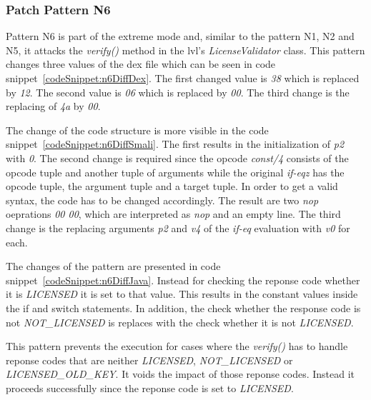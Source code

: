 \subsubsection{Patch Pattern N6}
Pattern N6 is part of the extreme mode and, similar to the pattern N1, N2 and N5, it attacks the \textit{verify()} method in the \gls{lvl}'s \textit{LicenseValidator} class.
\newline
This pattern changes three values of the \gls{dex} file which can be seen in code snippet~\ref{codeSnippet:n6DiffDex}.
The first changed value is \textit{38} which is replaced by \textit{12}.
The second value is \textit{06} which is replaced by \textit{00}.
The third change is the replacing of \textit{4a} by \textit{00}.
\newline

The change of the code structure is more visible in the code snippet~\ref{codeSnippet:n6DiffSmali}.
The first results in the initialization of \textit{p2} with \textit{0}.
The second change is required since the opcode \textit{const/4} consists of the  opcode tuple and another tuple of arguments while the original \textit{if-eqz} has the opcode tuple, the argument tuple and a target tuple.
In order to get a valid syntax, the code has to be changed accordingly.
The result are two \textit{nop} oeprations \textit{00 00}, which are interpreted as \textit{nop} and an empty line.
The third change is the replacing arguments \textit{p2} and \textit{v4} of the \textit{if-eq} evaluation with \textit{v0} for each.
\newline

The changes of the pattern are presented in code snippet~\ref{codeSnippet:n6DiffJava}.
Instead for checking the reponse code whether it is \textit{LICENSED} it is set to that value.
This results in the constant values inside the if and switch statements.
In addition, the check whether the response code is not \textit{NOT\_LICENSED} is replaces with the check whether it is not \textit{LICENSED}.
\newline

This pattern prevents the execution for cases where the \textit{verify()} has to handle reponse codes that are neither \textit{LICENSED}, \textit{NOT\_LICENSED} or \textit{LICENSED\_OLD\_KEY}.
It voids the impact of those reponse codes.
Instead it proceeds successfully since the reponse code is set to \textit{LICENSED}.

